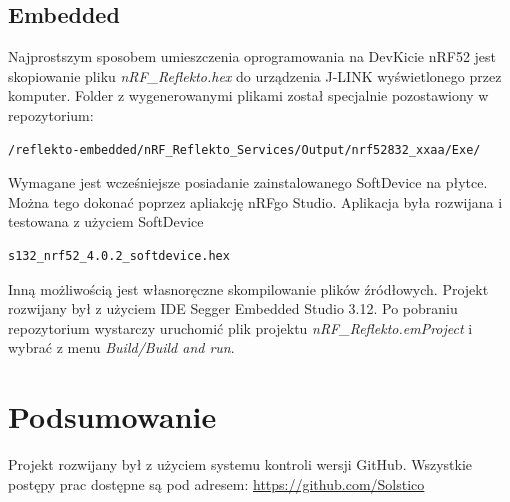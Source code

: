 \documentclass[a4paper,11pt]{article}
\begin{document}
\subsection{Embedded}
Najprostszym sposobem umieszczenia oprogramowania na DevKicie nRF52 jest skopiowanie pliku \textit{nRF\_Reflekto.hex} do urządzenia J-LINK wyświetlonego przez komputer. Folder z wygenerowanymi plikami został specjalnie pozostawiony w repozytorium: \begin{lstlisting}
/reflekto-embedded/nRF_Reflekto_Services/Output/nrf52832_xxaa/Exe/
\end{lstlisting} 
Wymagane jest wcześniejsze posiadanie zainstalowanego SoftDevice na płytce. Można tego dokonać poprzez apliakcję nRFgo Studio. Aplikacja była rozwijana i testowana z użyciem SoftDevice
\begin{lstlisting}
s132_nrf52_4.0.2_softdevice.hex
\end{lstlisting}
Inną możliwością jest własnoręczne skompilowanie plików źródłowych. Projekt rozwijany był z użyciem IDE Segger Embedded Studio 3.12. Po pobraniu repozytorium wystarczy uruchomić plik projektu
\textit{nRF\_Reflekto.emProject }i wybrać z menu \textit{Build/Build and run}.

\section{Podsumowanie}
Projekt rozwijany był z użyciem systemu kontroli wersji GitHub. Wszystkie postępy prac dostępne są pod adresem: \url{https://github.com/Solstico}
	
	
\end{document}
